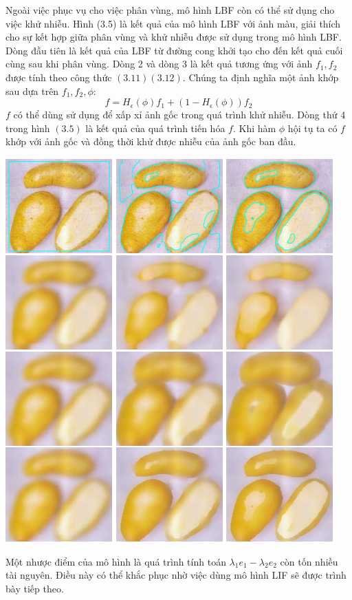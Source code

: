 \documentclass[14pt,oneside,a4paper]{extreport}
\begin{document}
Ngoài việc phục vụ cho việc phân vùng, mô hình LBF còn có thể sử dụng cho việc khử nhiễu. Hình (3.5) là kết quả của mô hình LBF với ảnh màu, giải thích cho sự kết hợp giữa phân vùng và khử nhiễu được sử dụng trong mô hình LBF. Dòng đầu tiên là kết quả của LBF từ đường cong khởi tạo cho đến kết quả cuối cùng sau khi phân vùng. Dòng 2 và dòng 3 là kết quả tương ứng với ảnh $f_1, f_2$ được tính theo công thức $(3.11)(3.12)$. Chúng ta định nghĩa một ảnh khớp sau dựa trên $f_1, f_2, \phi$:
\begin{equation*}
f=H_{\epsilon}(\phi)f_1+(1-H_{\epsilon}(\phi))f_2
\end{equation*}
$f$ có thể dùng sử dụng để xấp xỉ ảnh gốc trong quá trình khử nhiễu. Dòng thứ 4 trong hình $(3.5)$ là kết quả của quá trình tiến hóa $f$. Khi hàm $\phi$ hội tụ ta có $f$ khớp với ảnh gốc và đồng thời khử được nhiễu của ảnh gốc ban đầu. 

\begin{center}
\includegraphics[]{figure/denoise.png}
\end{center}

Một nhược điểm của mô hình là quá trình  tính toán $\lambda_1 e_1 -\lambda_2 e_2$ còn tốn nhiều tài nguyên. Điều này có thể khắc phục nhờ việc dùng mô hình LIF sẽ được trình bày tiếp theo.
\end{document}
